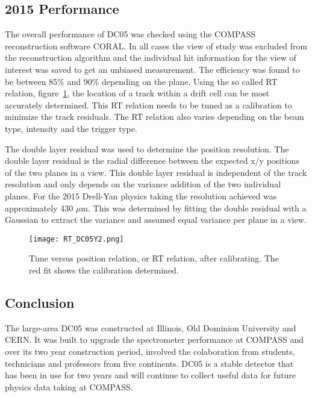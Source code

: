 \documentclass[aps,prl,twocolumn,groupedaddress]{revtex4-1}
\begin{document}
\subsection{2015 Performance}
The overall performance of DC05 was checked using the COMPASS
reconstruction software CORAL.  In all cases the view of study was excluded from
the reconstruction algorithm and the individual hit information for the view of
interest was saved to get an unbiased measurement.  The efficiency was found to
be between 85\% and 90\% depending on the plane.  Using the so called RT
relation, figure~\ref{fig:RT}, the location of a track within a drift cell can
be most accurately determined.  This RT relation needs to be tuned as a
calibration to minimize the track residuals.  The RT relation also varies
depending on the beam type, intensity and the trigger type.  \par The double
layer residual was used to determine the position resolution.  The double layer
residual is the radial difference between the expected x/y positions of the two
planes in a view.  This double layer residual is independent of the track
resolution and only depends on the variance addition of the two individual
planes.  For the 2015 Drell-Yan physics taking the resolution achieved was
approximately 430 $\mu$m. This was determined by fitting the double residual with a
Gaussian to extract the variance and assumed equal variance per plane in a view.

\begin{figure}
  \centering \texttt{[image: RT\_DC05Y2.png]}
  \caption{}{Time versus position relation, or RT relation, after calibrating.
    The red fit shows the calibration determined.}
  \label{fig:RT}%
\end{figure}

\subsection{Conclusion}
The large-area DC05 was constructed at Illinois, Old Dominion University and
CERN.  It was built to upgrade the spectrometer performance at COMPASS and over
its two year construction period, involved the colaboration from students,
technicians and professors from five continents.  DC05 is a stable detector that
has been in use for two years and will continue to collect useful data for
future physics data taking at COMPASS.

\end{document}
